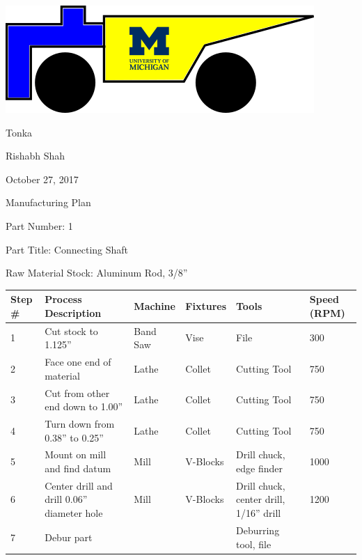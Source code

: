 \documentclass[11pt]{article}
\begin{document}
{\Large\noindent \includegraphics{Logo}

\noindent Tonka

\noindent Rishabh Shah

\noindent October 27, 2017

\noindent Manufacturing Plan\\}

{\large\noindent Part Number: 1

\noindent Part Title: Connecting Shaft

\noindent Raw Material Stock: Aluminum Rod, 3/8''\\}

\begin{table}[H]
	\begin{tabular}{l p{1.5in} l l p{1in	} l}
	\hline
	\textbf{Step \#} & \textbf{Process Description} & \textbf{Machine} & \textbf{Fixtures} & \textbf{Tools} & \textbf{Speed (RPM)} \\
	\hline
	1 & Cut stock to 1.125'' & Band Saw & Vise & File & 300 \\
	2 & Face one end of material & Lathe & Collet & Cutting Tool & 750 \\
	3 & Cut from other end down to 1.00'' & Lathe & Collet & Cutting Tool & 750 \\
	4 & Turn down from 0.38'' to 0.25'' & Lathe & Collet & Cutting Tool & 750 \\
	5 & Mount on mill and find datum & Mill & V-Blocks & Drill chuck, edge finder & 1000 \\
	6 & Center drill and drill 0.06'' diameter hole & Mill &  V-Blocks & Drill chuck, center drill, 1/16'' drill & 1200 \\
	7 & Debur part & & & Deburring tool, file & \\
	\hline
	\end{tabular}
\end{table}
\end{document}
